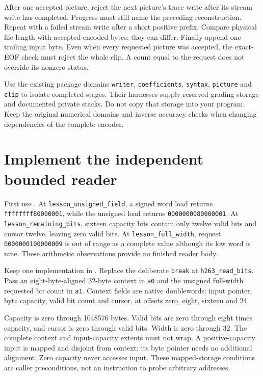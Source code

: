 After one accepted picture, reject the next picture's trace write after its stream
write has completed. Progress must still name the preceding reconstruction.
Repeat with a failed stream write after a short positive prefix. Compare physical
file length with accepted encoded bytes; they can differ. Finally append one
trailing input byte. Even when every requested picture was accepted, the exact-EOF
check must reject the whole clip. A count equal to the request does not override
its nonzero status.

Use the existing package domains \texttt{writer}, \texttt{coefficients},
\texttt{syntax}, \texttt{picture} and \texttt{clip} to isolate completed stages.
Their harnesses supply reserved grading storage and documented private stacks.
Do not copy that storage into your program. Keep the original numerical domains
and inverse accuracy checks when changing dependencies of the complete encoder.

\section{Implement the independent bounded reader}

First use . At
\texttt{lesson\_unsigned\_field}, a signed word load returns
\texttt{ffffffff80000001}, while the unsigned load returns
\texttt{0000000080000001}. At \texttt{lesson\_remaining\_bits}, sixteen
capacity bits contain only twelve valid bits and cursor twelve, leaving zero
valid bits. At \texttt{lesson\_full\_width}, request
\texttt{0000000100000009} is out of range as a complete value although its low
word is nine. These arithmetic observations provide no finished reader body.

Keep one implementation in . Replace the
deliberate \texttt{break} at \texttt{h263\_read\_bits}. Pass an
eight-byte-aligned 32-byte context in \texttt{a0} and the unsigned full-width
requested bit count in \texttt{a1}. Context fields are native doublewords:
input pointer, byte capacity, valid bit count and cursor, at offsets zero,
eight, sixteen and 24.

Capacity is zero through 1048576 bytes. Valid bits are zero through eight times
capacity, and cursor is zero through valid bits. Width is zero through 32.
The complete context and input-capacity extents must not wrap. A positive-capacity
input is mapped and disjoint from context; its byte pointer needs no additional
alignment. Zero capacity never accesses input. These mapped-storage conditions
are caller preconditions, not an instruction to probe arbitrary addresses.

